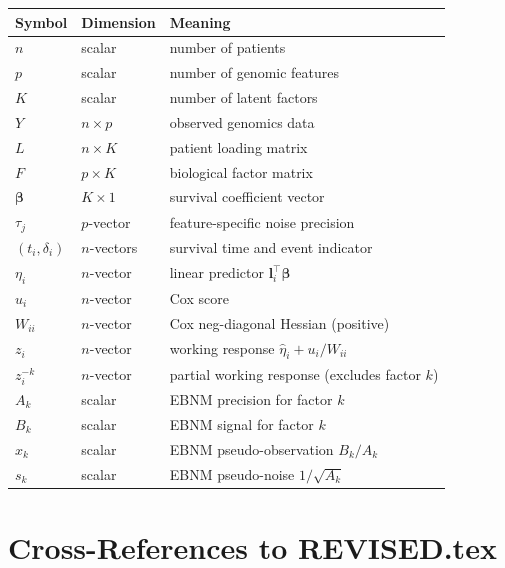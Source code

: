 \documentclass[11pt]{article}
\begin{document}
\begin{center}
\begin{tabular}{lll}
\toprule
\textbf{Symbol} & \textbf{Dimension} & \textbf{Meaning} \\
\midrule
$n$ & scalar & number of patients \\
$p$ & scalar & number of genomic features \\
$K$ & scalar & number of latent factors \\
$Y$ & $n\times p$ & observed genomics data \\
$L$ & $n\times K$ & patient loading matrix \\
$F$ & $p\times K$ & biological factor matrix \\
$\bm{\beta}$ & $K\times 1$ & survival coefficient vector \\
$\tau_j$ & $p$-vector & feature-specific noise precision \\
$(t_i, \delta_i)$ & $n$-vectors & survival time and event indicator \\
$\eta_i$ & $n$-vector & linear predictor $\bm{l}_i^\top\bm{\beta}$ \\
$u_i$ & $n$-vector & Cox score \\
$W_{ii}$ & $n$-vector & Cox neg-diagonal Hessian (positive) \\
$z_i$ & $n$-vector & working response $\hat{\eta}_i + u_i/W_{ii}$ \\
$z_i^{-k}$ & $n$-vector & partial working response (excludes factor $k$) \\
$A_k$ & scalar & EBNM precision for factor $k$ \\
$B_k$ & scalar & EBNM signal for factor $k$ \\
$x_k$ & scalar & EBNM pseudo-observation $B_k/A_k$ \\
$s_k$ & scalar & EBNM pseudo-noise $1/\sqrt{A_k}$ \\
\bottomrule
\end{tabular}
\end{center}

\section{Cross-References to REVISED.tex}\label{app:xref}
\end{document}
